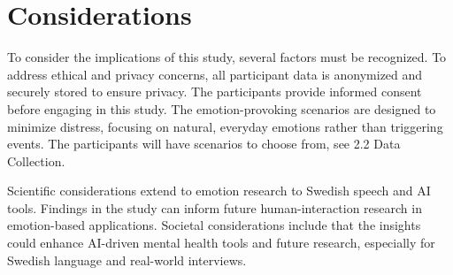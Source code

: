 \section{Considerations}
To consider the implications of this study, several factors must be recognized. To address ethical and privacy concerns, all participant data is anonymized and securely stored to ensure privacy. The participants provide informed consent before engaging in this study. The emotion-provoking scenarios are designed to minimize distress, focusing on natural, everyday emotions rather than triggering events. The participants will have scenarios to choose from, see 2.2 Data Collection. 

Scientific considerations extend to emotion research to Swedish speech and AI tools. Findings in the study can inform future human-interaction research in emotion-based applications. Societal considerations include that the insights could enhance AI-driven mental health tools and future research, especially for Swedish language and real-world interviews. 
